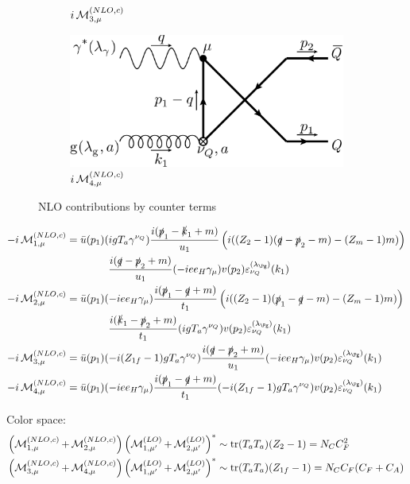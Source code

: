 \begin{figure}[ht!]
\begin{subfigure}[t]{.4\textwidth}
		\caption{$i\operatorname{\mathcal M}^{(NLO,c)}_{3,\mu}$}
	\end{subfigure}\hspace{.15\textwidth}%
	\begin{subfigure}[t]{.4\textwidth}
		\includegraphics[width=\textwidth]{pyfeyn/nlo-c-nuQcr}
		\caption{$i\operatorname{\mathcal M}^{(NLO,c)}_{4,\mu}$}
	\end{subfigure}
	\caption{NLO contributions by counter terms}\label{fig:FeynNLOvf}
\end{figure}

\begin{align}
-i\Md^{(NLO,c)}_{1,\mu} &=\bar u(p_1)(igT_a\gamma^{\nu_Q})\frac{i(\slashed{p}_1-\slashed{k}_1+m)}{u_1}\left(i((Z_2-1)(\slashed{q} - \slashed{p}_2- m) - (Z_m-1)m)\right)\nonumber\\
&\hspace{40pt}\frac{i(\slashed{q}-\slashed{p}_2+m)}{u_1}(-i e e_H \gamma_\mu)v(p_2)\varepsilon^{(\lambda_{\Pg})}_{\nu_Q}(k_1)\\
-i\Md^{(NLO,c)}_{2,\mu} &=\bar u(p_1)(-i e e_H \gamma_\mu)\frac{i(\slashed{p}_1-\slashed{q}+m)}{t_1}\left(i((Z_2-1)(\slashed{p}_1 - \slashed{q}- m) - (Z_m-1)m)\right)\nonumber\\
&\hspace{40pt}\frac{i(\slashed{k}_1-\slashed{p}_2+m)}{t_1}(igT_a\gamma^{\nu_Q})v(p_2)\varepsilon^{(\lambda_{\Pg})}_{\nu_Q}(k_1)\\
-i\Md^{(NLO,c)}_{3,\mu} &=\bar u(p_1)(-i(Z_{1f}-1)gT_a\gamma^{\nu_Q})\frac{i(\slashed{q}-\slashed{p}_2+m)}{u_1}(-i e e_H \gamma_\mu)v(p_2)\varepsilon^{(\lambda_{\Pg})}_{\nu_Q}(k_1)\\
-i\Md^{(NLO,c)}_{4,\mu} &=\bar u(p_1)(-i e e_H \gamma_\mu)\frac{i(\slashed{p}_1-\slashed{q}+m)}{t_1}(-i(Z_{1f}-1)gT_a\gamma^{\nu_Q})v(p_2)\varepsilon^{(\lambda_{\Pg})}_{\nu_Q}(k_1)
\end{align}

Color space:
\begin{align}
\left(\operatorname{\mathcal M}^{(NLO,c)}_{1,\mu}+\operatorname{\mathcal M}^{(NLO,c)}_{2,\mu}\right)\left(\operatorname{\mathcal M}^{(LO)}_{1,\mu'}+\operatorname{\mathcal M}^{(LO)}_{2,\mu'}\right)^*&\sim \operatorname{\text{tr}}(T_aT_a)(Z_2-1)=N_C C_F^2\\
\left(\operatorname{\mathcal M}^{(NLO,c)}_{3,\mu}+\operatorname{\mathcal M}^{(NLO,c)}_{4,\mu}\right)\left(\operatorname{\mathcal M}^{(LO)}_{1,\mu'}+\operatorname{\mathcal M}^{(LO)}_{2,\mu'}\right)^*&\sim \operatorname{\text{tr}}(T_aT_a)(Z_{1f}-1)=N_C C_F(C_F+C_A)
\end{align}
